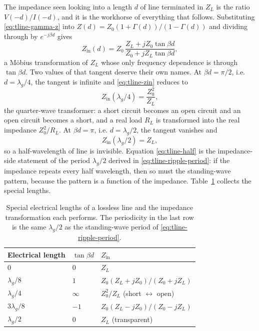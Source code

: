 The impedance seen looking into a length $d$ of line terminated in $Z_L$ is the ratio $V(-d)/I(-d)$, and it is
the workhorse of everything that follows. Substituting \eqref{eq:tline-gamma-z} into
$Z(d)=Z_0(1+\Gamma(d))/(1-\Gamma(d))$ and dividing through by $e^{-j\beta d}$ gives
\begin{equation}
  Z_{\mathrm{in}}(d) = Z_0\,\frac{Z_L + j Z_0 \tan\beta d}{Z_0 + j Z_L \tan\beta d} ,
  \label{eq:tline-zin}
\end{equation}
a M\"obius transformation of $Z_L$ whose only frequency dependence is through $\tan\beta d$. Two values of that
tangent deserve their own names. At $\beta d=\pi/2$, i.e. $d=\lambda_g/4$, the tangent is infinite and
\eqref{eq:tline-zin} reduces to
\begin{equation}
  Z_{\mathrm{in}}(\lambda_g/4) = \frac{Z_0^2}{Z_L} ,
  \label{eq:tline-quarter}
\end{equation}
the quarter-wave transformer: a short circuit becomes an open circuit and an open circuit becomes a short, and
a real load $R_L$ is transformed into the real impedance $Z_0^2/R_L$. At $\beta d=\pi$, i.e. $d=\lambda_g/2$,
the tangent vanishes and
\begin{equation}
  Z_{\mathrm{in}}(\lambda_g/2) = Z_L ,
  \label{eq:tline-half}
\end{equation}
so a half-wavelength of line is invisible. Equation \eqref{eq:tline-half} is the impedance-side statement of the
period $\lambda_g/2$ derived in \eqref{eq:tline-ripple-period}: if the impedance repeats every half wavelength,
then so must the standing-wave pattern, because the pattern is a function of the impedance.
Table~\ref{tab:tline-speciallens} collects the special lengths.

\begin{table}[H]
  \centering
  \caption{Special electrical lengths of a lossless line and the impedance transformation each performs. The periodicity in the last row is the same $\lambda_g/2$ as the standing-wave period of \eqref{eq:tline-ripple-period}.}
  \label{tab:tline-speciallens}
  \small
  \begin{tabular}{@{}lll@{}}
    \toprule
    Electrical length & $\tan\beta d$ & $Z_{\mathrm{in}}$ \\
    \midrule
    $0$                & $0$        & $Z_L$ \\
    $\lambda_g/8$      & $1$        & $Z_0(Z_L+jZ_0)/(Z_0+jZ_L)$ \\
    $\lambda_g/4$      & $\infty$   & $Z_0^2/Z_L$ (short $\leftrightarrow$ open) \\
    $3\lambda_g/8$     & $-1$       & $Z_0(Z_L-jZ_0)/(Z_0-jZ_L)$ \\
    $\lambda_g/2$      & $0$        & $Z_L$ (transparent) \\
    \bottomrule
  \end{tabular}
\end{table}

